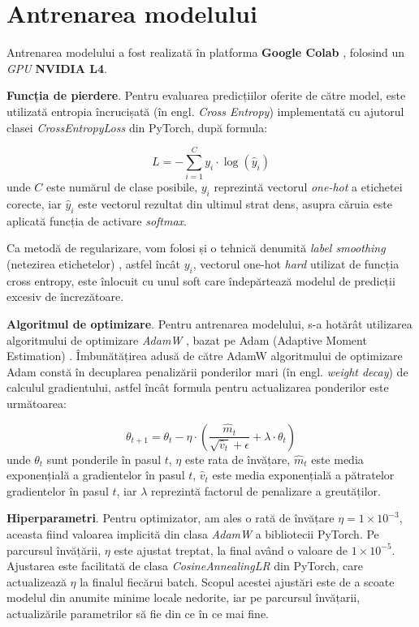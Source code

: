 \section{Antrenarea modelului}
Antrenarea modelului a fost realizată în platforma \textbf{Google Colab} \cite{colab}, folosind un \textit{GPU} \textbf{NVIDIA L4}.

\textbf{Funcția de pierdere}. Pentru evaluarea predicțiilor oferite de către model, este utilizată entropia încrucișată (în engl. \textit{Cross Entropy}) implementată cu ajutorul clasei \textit{CrossEntropyLoss} din PyTorch, după formula:

\begin{equation}
    L = - \sum_{i=1}^{C}y_i \cdot \log(\hat{y}_i)
\end{equation}
unde $C$ este numărul de clase posibile, $y_i$ reprezintă vectorul \textit{one-hot} a etichetei corecte, iar $\hat{y}_i$ este vectorul rezultat din ultimul strat dens, asupra căruia este aplicată funcția de activare \textit{softmax}.

Ca metodă de regularizare, vom folosi și o tehnică denumită \textit{label smoothing} (netezirea etichetelor) \cite{label_smooth}, astfel încât $y_i$, vectorul one-hot \textit{hard} utilizat de funcția cross entropy, este înlocuit cu unul soft care îndepărtează modelul de predicții excesiv de încrezătoare.


\textbf{Algoritmul de optimizare}. Pentru antrenarea modelului, s-a hotărât utilizarea algoritmului de optimizare \textit{AdamW} \cite{adamw_article}, bazat pe Adam (Adaptive Moment Estimation) \cite{adam_article}. Îmbunătățirea adusă de către AdamW algoritmului de optimizare Adam constă în decuplarea 
penalizării ponderilor mari (în engl. \textit{weight decay}) de calculul gradientului, astfel încât formula pentru actualizarea ponderilor este următoarea: 

\begin{equation}
    \theta_{t+1} = \theta_t - \eta \cdot \left(\frac{\hat{m}_t}{\sqrt{\hat{v}_t} + \epsilon} + \lambda \cdot \theta_t\right)
\end{equation}
unde $\theta_{t}$ sunt ponderile în pasul $t$, $\eta$ este rata de învățare, $\hat{m}_t$ este media exponențială a gradientelor în pasul $t$, $\hat{v}_t$ este  media exponențială a pătratelor gradientelor în pasul $t$, iar $\lambda$ reprezintă factorul de penalizare a greutăților.


\textbf{Hiperparametri}. Pentru optimizator, am ales o rată de învățare $\eta = 1\times 10^{-3}$, aceasta fiind valoarea implicită din clasa \textit{AdamW} a bibliotecii PyTorch. Pe parcursul învățării, $\eta$ este ajustat treptat, la final având o valoare de $1\times10^{-5}$. Ajustarea este facilitată de clasa \textit{CosineAnnealingLR} din PyTorch, care actualizează $\eta$ la finalul fiecărui batch. Scopul acestei ajustări este de a scoate modelul din anumite minime locale nedorite, iar pe parcursul învățarii, actualizările parametrilor să fie din ce în ce mai fine.

